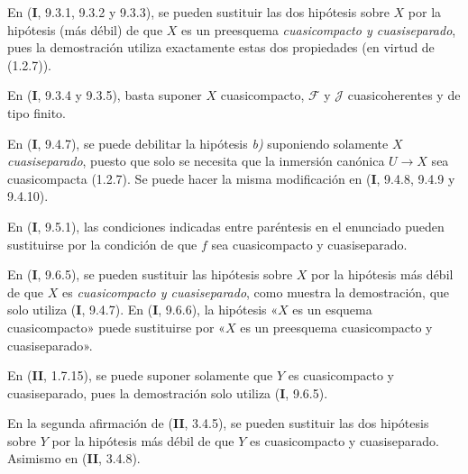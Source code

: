 \begin{env}[1.7.5]
\label{IV.1.7.5-fr}
En (\textbf{I}, 9.3.1, 9.3.2 y 9.3.3), se pueden sustituir las dos hipótesis sobre $X$
por la hipótesis (más débil) de que $X$ es un preesquema \emph{cuasicompacto y
cuasiseparado}, pues la demostración utiliza exactamente estas dos propiedades (en
virtud de (1.2.7)).
\end{env}

\begin{env}[1.7.6]
\label{IV.1.7.6-fr}
En (\textbf{I}, 9.3.4 y 9.3.5), basta suponer $X$ cuasicompacto,
$\mathcal F$ y $\mathcal J$ cuasicoherentes y de tipo finito.
\end{env}

\begin{env}[1.7.7]
\label{IV.1.7.7-fr}
En (\textbf{I}, 9.4.7), se puede debilitar la hipótesis \emph{b)} suponiendo solamente $X$
\emph{cuasiseparado}, puesto que solo se necesita que la inmersión canónica
$U\to X$ sea cuasicompacta (1.2.7). Se puede hacer la misma modificación en
(\textbf{I}, 9.4.8, 9.4.9 y 9.4.10).
\end{env}

\begin{env}[1.7.8]
\label{IV.1.7.8-fr}
En (\textbf{I}, 9.5.1), las condiciones indicadas entre paréntesis en el enunciado
pueden sustituirse por la condición de que $f$ sea cuasicompacto y
cuasiseparado.
\end{env}

\begin{env}[1.7.9]
\label{IV.1.7.9-fr}
En (\textbf{I}, 9.6.5), se pueden sustituir las hipótesis sobre $X$ por la hipótesis
más débil de que $X$ es \emph{cuasicompacto y cuasiseparado}, como muestra la
demostración,
que solo utiliza (\textbf{I}, 9.4.7). En (\textbf{I}, 9.6.6), la hipótesis «$X$ es un
esquema cuasicompacto» puede sustituirse por «$X$ es un preesquema
cuasicompacto y cuasiseparado».
\end{env}

\begin{env}[1.7.10]
\label{IV.1.7.10-fr}
En (\textbf{II}, 1.7.15), se puede suponer solamente que $Y$ es cuasicompacto y
cuasiseparado, pues la demostración solo utiliza (\textbf{I}, 9.6.5).
\end{env}

\begin{env}[1.7.11]
\label{IV.1.7.11-fr}
En la segunda afirmación de (\textbf{II}, 3.4.5), se pueden sustituir las dos
hipótesis sobre $Y$ por la hipótesis más débil de que $Y$ es cuasicompacto y
cuasiseparado. Asimismo en (\textbf{II}, 3.4.8).
\end{env}

